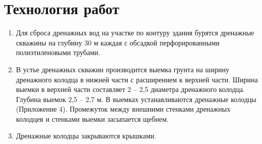 \documentclass[a4paper,12pt]{article} %
\begin{document}
\section{Технология работ}

\begin{enumerate}
\item Для сброса дренажных вод на участке по контуру здания бурятся дренажные скважины на глубину 30 м каждая с обсадкой перфорированными полиэтиленовыми трубами.
\item В устье дренажных скважин производится выемка грунта на ширину дренажного колодца в нижней части  с расширением к верхней части. Ширина выемки в верхней части составляет 2 – 2,5 диаметра дренажного колодца. Глубина выемок 2,5 – 2,7 м. В выемках устанавливаются  дренажные колодцы (Приложение 4). Промежуток между внешними стенками дренажных колодцев и стенками выемки засыпается щебнем.
\item Дренажные колодцы закрываются крышками.

\end{enumerate}
\end{document}
